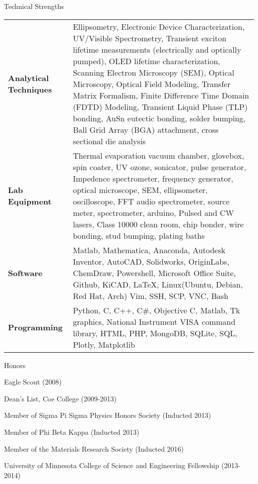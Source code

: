 \documentclass{resume} %
\begin{document}
\begin{rSection}{Technical Strengths}

\begin{tabular}{ @{} >{\bfseries}l @{\hspace{3ex}} p{12.5cm} }
Analytical Techniques & Ellipsometry, Electronic Device Characterization, UV/Visible Spectrometry, Transient exciton lifetime measurements (electrically and optically pumped), OLED lifetime characterization, Scanning Electron Microscopy (SEM), Optical Microscopy, Optical Field Modeling, Transfer Matrix Formalism, Finite Difference Time Domain (FDTD) Modeling, Transient Liquid Phase (TLP) bonding, AuSn eutectic bonding, solder bumping, Ball Grid Array (BGA) attachment, cross sectional die analysis \\
Lab Equipment & Thermal evaporation vacuum chamber, glovebox, spin coater, UV ozone, sonicator, pulse generator, Impedence spectrometer, frequency generator, optical microscope, SEM, ellipsometer, oscilloscope, FFT audio spectrometer, source meter, spectrometer, arduino, Pulsed and CW lasers, Class 10000 clean room, chip bonder, wire bonding, stud bumping, plating baths \\
Software & Matlab, Mathematica, Anaconda, Autodesk Inventor, AutoCAD, Solidworks, OriginLabs, ChemDraw, Powershell, Microsoft Office Suite, Github, KiCAD, \LaTeX , Linux(Ubuntu, Debian, Red Hat, Arch) Vim, SSH, SCP, VNC, Bash \\
Programming & Python, C, C++, C\#, Objective C, Matlab, Tk graphics, National Instrument VISA command library, HTML, PHP, MongoDB, SQLite, SQL, Plotly, Matplotlib \\
\end{tabular}

\end{rSection}


\begin{rSection}{Honors}

\item Eagle Scout (2008)
\item Dean's List, Coe College (2009-2013)
\item Member of Sigma Pi Sigma Physics Honors Society (Inducted 2013)
\item Member of Phi Beta Kappa (Inducted 2013)
\item Member of the Materials Research Society (Inducted 2016)
\item University of Minnesota College of Science and Engineering Fellowship (2013-2014)

\end{rSection}
\end{document}
